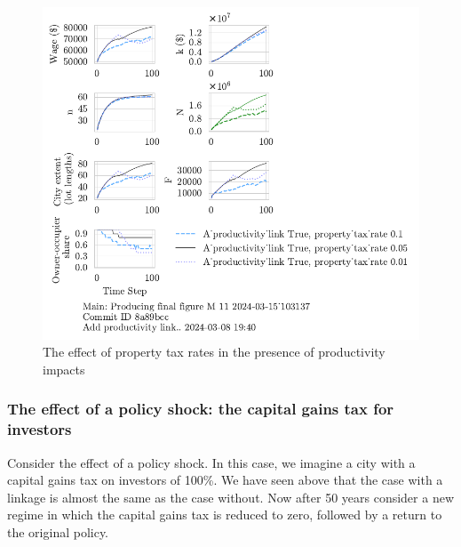 \begin{figure}[h!tb] 
    \centering
    \includegraphics[scale=.8, trim={0 1.4cm 0 0},clip]{fig/With-productivity_link-property_tax-103137.pdf}  %
    \caption{The effect of property tax rates in the presence of productivity impacts}
    \label{fig:Productivity_link_and_property_tax_ownership_trajectory}
\end{figure}


\newpage

\subsubsection{The effect of a policy shock: the capital gains tax for investors}
Consider the effect of a policy shock. In this case, we imagine a city with a capital gains tax on investors of 100\%. We have seen above that the case with a linkage is almost the same as the case without. Now after 50 years consider a new regime in which the capital gains tax is reduced to zero, followed by a return to the original policy.

